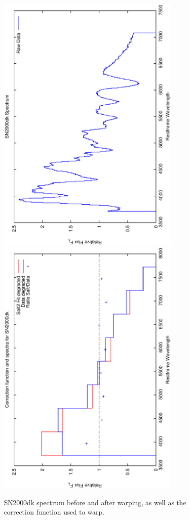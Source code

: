 \clearpage

\begin{figure}[p]
\centering
\includegraphics[angle=-90,width=0.8\textwidth]{./figures/spectrabeforeafter/SN2000dk_handpicked_v001_v027_before_after_spectra.ps}
\hfill
\includegraphics[angle=-90,width=0.8\textwidth]{./figures/corrections/SN2000dk_v001_correction.ps}
\hfill
\caption{SN2000dk spectrum before and after warping, as well as the correction function used to warp.}
\label{fig:SN2000dkfour1}
\end{figure}

